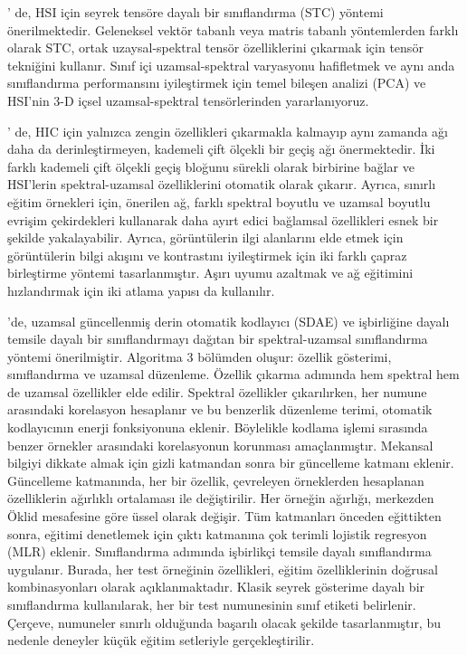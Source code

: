 \citep{liu2020sparse} ' de, HSI için seyrek tensöre dayalı bir sınıflandırma (STC) yöntemi önerilmektedir. Geleneksel vektör tabanlı veya matris tabanlı yöntemlerden farklı olarak STC, ortak uzaysal-spektral tensör özelliklerini çıkarmak için tensör tekniğini kullanır. Sınıf içi uzamsal-spektral varyasyonu hafifletmek ve aynı anda sınıflandırma performansını iyileştirmek için temel bileşen analizi (PCA) ve HSI'nin 3-D içsel uzamsal-spektral tensörlerinden yararlanıyoruz. 

\citep{cao2020cascaded}' de, HIC için yalnızca zengin özellikleri çıkarmakla kalmayıp aynı zamanda ağı daha da derinleştirmeyen, kademeli çift ölçekli bir geçiş ağı önermektedir. İki farklı kademeli çift ölçekli geçiş bloğunu sürekli olarak birbirine bağlar ve HSI'lerin spektral-uzamsal özelliklerini otomatik olarak çıkarır. Ayrıca, sınırlı eğitim örnekleri için, önerilen ağ, farklı spektral boyutlu ve uzamsal boyutlu evrişim çekirdekleri kullanarak daha ayırt edici bağlamsal özellikleri esnek bir şekilde yakalayabilir. Ayrıca, görüntülerin ilgi alanlarını elde etmek için görüntülerin bilgi akışını ve kontrastını iyileştirmek için iki farklı çapraz birleştirme yöntemi tasarlanmıştır. Aşırı uyumu azaltmak ve ağ eğitimini hızlandırmak için iki atlama yapısı da kullanılır. 

\citep{ma2016spectral}'de,  uzamsal güncellenmiş derin otomatik kodlayıcı (SDAE) ve işbirliğine dayalı temsile dayalı bir sınıflandırmayı dağıtan bir spektral-uzamsal sınıflandırma yöntemi önerilmiştir. Algoritma 3 bölümden oluşur: özellik gösterimi, sınıflandırma ve uzamsal düzenleme. Özellik çıkarma adımında hem spektral hem de uzamsal özellikler elde edilir. Spektral özellikler çıkarılırken, her numune arasındaki korelasyon hesaplanır ve bu benzerlik düzenleme terimi, otomatik kodlayıcının enerji fonksiyonuna eklenir. Böylelikle kodlama işlemi sırasında benzer örnekler arasındaki korelasyonun korunması amaçlanmıştır. Mekansal bilgiyi dikkate almak için gizli katmandan sonra bir güncelleme katmanı eklenir. Güncelleme katmanında, her bir özellik, çevreleyen örneklerden hesaplanan özelliklerin ağırlıklı ortalaması ile değiştirilir. Her örneğin ağırlığı, merkezden Öklid mesafesine göre üssel olarak değişir. Tüm katmanları önceden eğittikten sonra, eğitimi denetlemek için çıktı katmanına çok terimli lojistik regresyon (MLR) eklenir. Sınıflandırma adımında işbirlikçi temsile dayalı sınıflandırma uygulanır. Burada, her test örneğinin özellikleri, eğitim özelliklerinin doğrusal kombinasyonları olarak açıklanmaktadır. Klasik seyrek gösterime dayalı bir sınıflandırma kullanılarak, her bir test numunesinin sınıf etiketi belirlenir. Çerçeve, numuneler sınırlı olduğunda başarılı olacak şekilde tasarlanmıştır, bu nedenle deneyler küçük eğitim setleriyle gerçekleştirilir.

